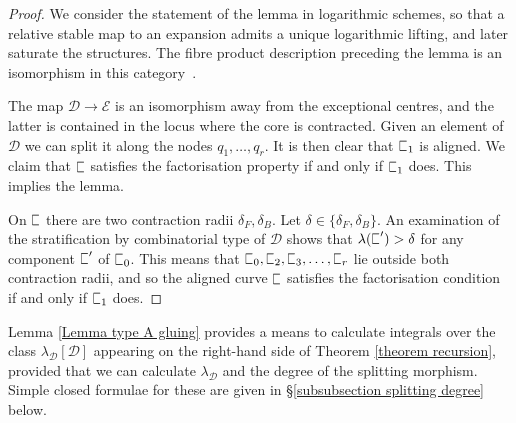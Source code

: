 \documentclass[11pt]{amsart}
\newcommand{\sqC}{\scalebox{0.8}[1.3]{$\sqsubset$}}
\newcommand{\PP}{\mathbb P}
\renewcommand{\to}{\rightarrow}
\newcommand{\Dcal}{\mathcal{D}}
\newcommand{\Ecal}{\mathcal{E}}
\theoremstyle{definition}
\newtheorem{lemma}[thm]{Lemma}
\theoremstyle{definition}
\begin{document}
\begin{proof}
We consider the statement of the lemma in logarithmic schemes, so that a relative stable map to an expansion admits a unique logarithmic lifting, and later saturate the structures. The fibre product description preceding the lemma is an isomorphism in this category~\cite[Lemma~4.2.2]{AbramovichMarcusWiseComparison}.

The map $\Dcal\to\Ecal$ is an isomorphism away from the exceptional centres, and the latter is contained in the locus where the core is contracted. Given an element of $\Dcal$ we can split it along the nodes $q_1,\ldots,q_r$. It is then clear that $\sqC_1$ is aligned. We claim that $\sqC$ satisfies the factorisation property if and only if $\sqC_1$ does. This implies the lemma.

On $\sqC$ there are two contraction radii $\delta_F,\delta_B$. Let $\delta \in \{\delta_F,\delta_B\}$. An examination of the stratification by combinatorial type of $\Dcal$ shows that $\lambda(\sqC^\prime) > \delta$ for any component $\sqC^\prime$ of $\sqC_0$. This means that $\sqC_0,\sqC_2,\sqC_3,\ldots,\sqC_r$ lie outside both contraction radii, and so the aligned curve $\sqC$ satisfies the factorisation condition if and only if $\sqC_1$ does. \end{proof}

%
\noindent Lemma \ref{Lemma type A gluing} provides a means to calculate integrals over the class $\lambda_\Dcal[\Dcal]$ appearing on the right-hand side of Theorem \ref{theorem recursion}, provided that we can calculate $\lambda_\Dcal$ and the degree of the splitting morphism. Simple closed formulae for these are given in \S \ref{subsubsection splitting degree} below.
\end{document}
